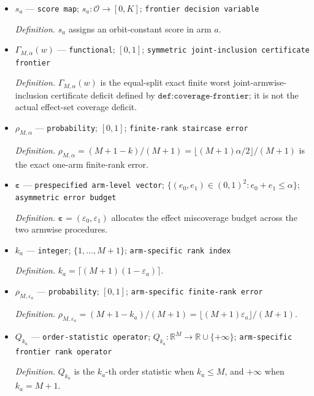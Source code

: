 \documentclass{article}
\begin{document}
\begin{itemize}
  \par\smallskip\noindent\emph{Definition.} \(Q_k(x_1,\ldots,x_M)\) is the \(k\)-th order statistic if \(k\le M\), and \(+\infty\) if \(k=M+1\).
  \item \(s_a\) --- \texttt{score map}; \(s_a:\mathcal O\to[0,K]\); \texttt{frontier decision variable}
  \par\smallskip\noindent\emph{Definition.} \(s_a\) assigns an orbit-constant score in arm \(a\).
  \item \(\Gamma_{M,\alpha}(w)\) --- \texttt{functional}; \([0,1]\); \texttt{symmetric joint-\allowbreak{}inclusion certificate frontier}
  \par\smallskip\noindent\emph{Definition.} \(\Gamma_{M,\alpha}(w)\) is the equal-split exact finite worst joint-armwise-inclusion certificate deficit defined by \(\texttt{def:coverage-frontier}\); it is not the actual effect-set coverage deficit.
  \item \(\rho_{M,\alpha}\) --- \texttt{probability}; \([0,1]\); \texttt{finite-\allowbreak{}rank staircase error}
  \par\smallskip\noindent\emph{Definition.} \(\rho_{M,\alpha}=(M+1-k)/(M+1)=\lfloor(M+1)\alpha/2\rfloor/(M+1)\) is the exact one-arm finite-rank error.
  \item \(\boldsymbol\varepsilon\) --- \texttt{prespecified arm-\allowbreak{}level vector}; \(\{(e_0,e_1)\in(0,1)^2:e_0+e_1\le\alpha\}\); \texttt{asymmetric error budget}
  \par\smallskip\noindent\emph{Definition.} \(\boldsymbol\varepsilon=(\varepsilon_0,\varepsilon_1)\) allocates the effect miscoverage budget across the two armwise procedures.
  \item \(k_a\) --- \texttt{integer}; \(\{1,\ldots,M+1\}\); \texttt{arm-\allowbreak{}specific rank index}
  \par\smallskip\noindent\emph{Definition.} \(k_a=\lceil(M+1)(1-\varepsilon_a)\rceil\).
  \item \(\rho_{M,\varepsilon_a}\) --- \texttt{probability}; \([0,1]\); \texttt{arm-\allowbreak{}specific finite-\allowbreak{}rank error}
  \par\smallskip\noindent\emph{Definition.} \(\rho_{M,\varepsilon_a}=(M+1-k_a)/(M+1)=\lfloor(M+1)\varepsilon_a\rfloor/(M+1)\).
  \item \(Q_{k_a}\) --- \texttt{order-\allowbreak{}statistic operator}; \(Q_{k_a}:\mathbb R^M\to\mathbb R\cup\{+\infty\}\); \texttt{arm-\allowbreak{}specific frontier rank operator}
  \par\smallskip\noindent\emph{Definition.} \(Q_{k_a}\) is the \(k_a\)-th order statistic when \(k_a\le M\), and \(+\infty\) when \(k_a=M+1\).

\end{itemize}
\end{document}
